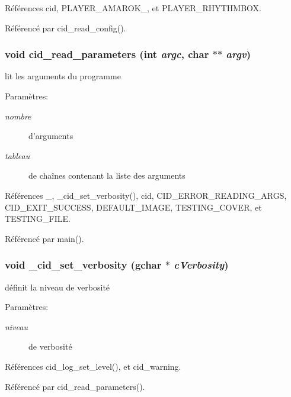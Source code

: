 Références cid, PLAYER\_\-AMAROK\_, et PLAYER\_\-RHYTHMBOX.

Référencé par cid\_\-read\_\-config().
\subsubsection{\setlength{\rightskip}{0pt plus 5cm}void cid\_\-read\_\-parameters (int {\em argc}, \/  char $\ast$$\ast$ {\em argv})}\label{cid-utilities_8h_a4c249f9f77ac45bcbf856a461413965}


lit les arguments du programme \begin{Desc}
\item[Paramètres:]
\begin{description}
\item[{\em nombre}]d'arguments \item[{\em tableau}]de chaînes contenant la liste des arguments \end{description}
\end{Desc}


Références \_\-, \_\-cid\_\-set\_\-verbosity(), cid, CID\_\-ERROR\_\-READING\_\-ARGS, CID\_\-EXIT\_\-SUCCESS, DEFAULT\_\-IMAGE, TESTING\_\-COVER, et TESTING\_\-FILE.

Référencé par main().
\subsubsection{\setlength{\rightskip}{0pt plus 5cm}void \_\-cid\_\-set\_\-verbosity (gchar $\ast$ {\em cVerbosity})}\label{cid-utilities_8h_b57ea7ec4a6b249a5d78d624a07b30d7}


définit la niveau de verbosité \begin{Desc}
\item[Paramètres:]
\begin{description}
\item[{\em niveau}]de verbosité \end{description}
\end{Desc}


Références cid\_\-log\_\-set\_\-level(), et cid\_\-warning.

Référencé par cid\_\-read\_\-parameters().
